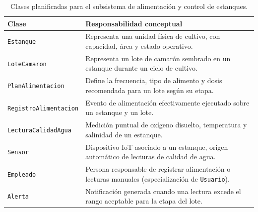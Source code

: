 \documentclass[11pt,a4paper]{article}
\begin{document}
\begin{table}[h!]
\centering
\small
\begin{tabular}{@{}L{3.7cm}L{9.5cm}@{}}
\toprule
\textbf{Clase} & \textbf{Responsabilidad conceptual} \\
\midrule
\texttt{Estanque} & Representa una unidad física de cultivo, con capacidad, área y estado operativo. \\
\texttt{LoteCamaron} & Representa un lote de camarón sembrado en un estanque durante un ciclo de cultivo. \\
\texttt{PlanAlimentacion} & Define la frecuencia, tipo de alimento y dosis recomendada para un lote según su etapa. \\
\texttt{RegistroAlimentacion} & Evento de alimentación efectivamente ejecutado sobre un estanque y un lote. \\
\texttt{LecturaCalidadAgua} & Medición puntual de oxígeno disuelto, temperatura y salinidad de un estanque. \\
\texttt{Sensor} & Dispositivo IoT asociado a un estanque, origen automático de lecturas de calidad de agua. \\
\texttt{Empleado} & Persona responsable de registrar alimentación o lecturas manuales (especialización de \texttt{Usuario}). \\
\texttt{Alerta} & Notificación generada cuando una lectura excede el rango aceptable para la etapa del lote. \\
\bottomrule
\end{tabular}
\caption{Clases planificadas para el subsistema de alimentación y control de estanques.}
\end{table}
\end{document}
